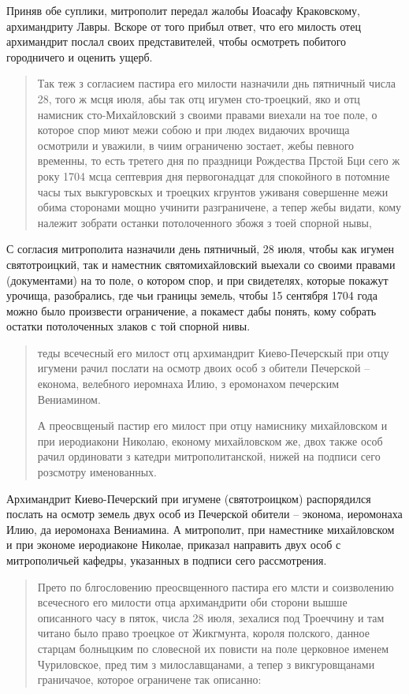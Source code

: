 Приняв обе суплики, митрополит передал жалобы Иоасафу Краковскому, архимандриту Лавры. Вскоре от того прибыл ответ, что его милость отец архимандрит послал своих представителей, чтобы осмотреть побитого городничего и оценить ущерб.

\begin{quotation}
Так теж з согласием пастира его милости назначили днь пятничный числа 28, того ж мсця июля, абы так отц игумен сто-троецкий, яко и отц намисник сто-Михайловский з своими правами виехали на тое поле, о которое спор миют межи собою и при людех видаючих врочища осмотрили и уважили, в чиим ограниченю зостает, жебы певного временны, то есть третего дня по праздници Рождества Прстой Бци сего ж року 1704 мсца септеврия дня первогонадцат для спокойного в потомние часы тых выкгуровскых и троецких кгрунтов уживаня совершенне межи обима сторонами мощно учинити разграничене, а тепер жебы видати, кому належит зобрати останки потолоченного збожя з тоей спорной нывы, 
\end{quotation}

С согласия митрополита назначили день пятничный, 28 июля, чтобы как игумен святотроицкий, так и наместник святомихайловский выехали со своими правами (документами) на то поле, о котором спор, и при свидетелях, которые покажут урочища, разобрались, где чьи границы земель, чтобы 15 сентября 1704 года можно было произвести ограничение, а покамест дабы понять, кому собрать остатки потолоченных злаков с той спорной нивы.

\begin{quotation}
теды всечесный его милост отц архимандрит Киево-Печерскый при отцу игумени рачил послати на осмотр двоих особ з обители Печерской – економа, велебного иеромнаха Илию, з еромонахом печерским Вениамином. 

А преосвщеный пастир его милост при отцу намиснику михайловском и при иеродиакони Николаю, економу михайловском же, двох также особ рачил ординовати з катедри митрополитанской, нижей на подписи сего розсмотру именованных.
\end{quotation}

Архимандрит Киево-Печерский при игумене (святотроицком) распорядился послать на осмотр земель двух особ из Печерской обители – эконома, иеромонаха Илию, да иеромонаха Вениамина. А митрополит, при наместнике михайловском и при экономе иеродиаконе Николае, приказал направить двух особ с митрополичьей кафедры, указанных в подписи сего рассмотрения.

\begin{quotation}
Прето по блгословению преосвщенного пастира его млсти и соизволению всечесного его милости отца архимандрити оби сторони вышше описанного часу в пяток, числа 28 июля, зехалися под Троеччину и там читано было право троецкое от Жикгмунта, короля полского, данное старцам болныцким по словесной их повисти на поле церковное именем Чуриловское, пред тим з милославщанами, а тепер з викгуровщанами граничачое, которое ограничене так описанно: 
\end{quotation}

